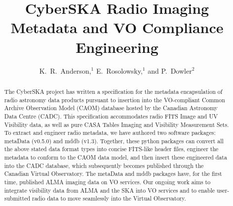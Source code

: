 
\resetcounters





\title{CyberSKA Radio Imaging Metadata and VO Compliance Engineering}
\author{K.~R.~Anderson,$^1$ E.~Rosolowsky,$^1$ and P.~Dowler$^2$
}


\begin{abstract}
The CyberSKA project has written a specification for the metadata encapsulation of radio astronomy data products pursuant to insertion into the VO-compliant Common Archive Observation Model (CAOM) database hosted by the Canadian Astronomy Data Centre (CADC). This specification accommodates radio FITS Image and UV Visibility data, as well as pure CASA Tables Imaging and Visibility Measurement Sets. To extract and engineer radio metadata, we have authored two software packages: metaData (v0.5.0) and mddb (v1.3). Together, these python packages can convert all the above stated data format types into concise FITS-like header files, engineer the metadata to conform to the CAOM data model, and then insert these engineered data into the CADC database, which subsequently becomes published through the Canadian Virtual Observatory. The metaData and mddb packages have, for the first time, published ALMA imaging data on VO services. Our ongoing work aims to integrate visibility data from ALMA and the SKA into VO services and to enable user-submitted radio data to move seamlessly into the Virtual Observatory. 
\end{abstract}

